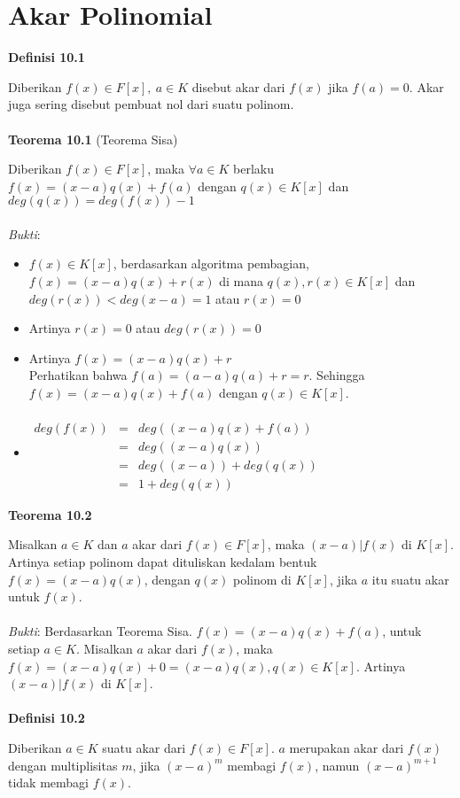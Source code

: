 \chapter{Akar Polinomial}
\textbf{Definisi 10.1}
	\par Diberikan $f(x) \in F[x],~a \in K$ disebut akar dari $f(x)$ jika $f(a)=0$. Akar juga sering disebut pembuat nol dari suatu polinom.\\
\\ \textbf{Teorema 10.1} (Teorema Sisa)
	\par Diberikan $f(x) \in F[x]$, maka $\forall a \in K$ berlaku $f(x)=(x-a)q(x)+f(a)$ dengan $q(x) \in K[x]$ dan $deg(q(x)) = deg(f(x))-1$\\
\\ \textit{Bukti}:
\begin{itemize}
\item $f(x) \in K[x]$, berdasarkan algoritma pembagian, $f(x) = (x-a)q(x)+r(x)$ di mana $q(x),r(x) \in K[x]$ dan $deg(r(x)) < deg (x-a)=1$ atau $r(x)=0$
\item Artinya $r(x)=0$ atau $deg(r(x))=0$
\item Artinya $f(x)=(x-a)q(x)+r$\\
Perhatikan bahwa $f(a)=(a-a)q(a)+r=r$. Sehingga $f(x)=(x-a)q(x)+f(a)$ dengan $q(x) \in K[x]$.
\item $\begin{array}{rcl}
\\ deg(f(x)) &=& deg((x-a)q(x)+f(a))
\\&=& deg ((x-a)q(x))
\\&=& deg((x-a)) + deg(q(x))
\\&=&1 + deg(q(x))
\end{array}$
\end{itemize}
\textbf{Teorema 10.2}
	\par Misalkan $a \in K$ dan $a$ akar dari $f(x) \in F[x]$, maka $(x-a)|f(x)$ di $K[x]$. Artinya setiap polinom dapat dituliskan kedalam bentuk $f(x)=(x-a)q(x)$, dengan $q(x)$ polinom di $K[x]$, jika $a$ itu suatu akar untuk $f(x)$.\\
\\ \textit{Bukti}: Berdasarkan Teorema Sisa. $f(x)=(x-a)q(x)+f(a)$, untuk setiap $a \in K$. Misalkan $a$ akar dari $f(x)$, maka $f(x)=(x-a)q(x)+0=(x-a)q(x), q(x) \in K[x]$. Artinya $(x-a)|f(x)$ di $K[x]$.\\
\\ \textbf{Definisi 10.2}
	\par Diberikan $a \in K$ suatu akar dari $f(x) \in F[x]$. $a$ merupakan akar dari $f(x)$ dengan multiplisitas $m$, jika $(x-a)^m$ membagi $f(x)$, namun $(x-a)^{m+1}$ tidak membagi $f(x)$.\\

